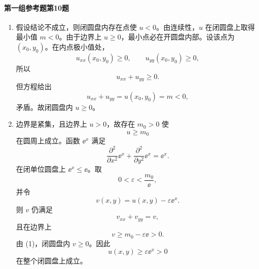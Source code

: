 \paragraph{第一组参考题第10题}
\begin{xsolution}
\begin{enumerate}[label=(\arabic*)]
  \item 假设结论不成立，则闭圆盘内存在点使 $u<0$。由连续性，$u$ 在闭圆盘上取得最小值 $m<0$。由于边界上 $u\ge0$，最小点必在开圆盘内部。设该点为 $(x_0,y_0)$。在内点极小值处，
  \[
    u_{xx}(x_0,y_0)\ge0,
    \qquad
    u_{yy}(x_0,y_0)\ge0,
  \]
  所以
  \[
    u_{xx}+u_{yy}\ge0.
  \]
  但方程给出
  \[
    u_{xx}+u_{yy}=u(x_0,y_0)=m<0,
  \]
  矛盾。故闭圆盘内 $u\ge0$。

  \item 边界是紧集，且边界上 $u>0$，故存在 $m_0>0$ 使
  \[
    u\ge m_0
  \]
  在圆周上成立。函数 $\ee^x$ 满足
  \[
    \frac{\partial^2}{\partial x^2}\ee^x
    +\frac{\partial^2}{\partial y^2}\ee^x
    =\ee^x.
  \]
  在闭单位圆盘上 $\ee^x\le\ee$。取
  \[
    0<\varepsilon<\frac{m_0}{\ee},
  \]
  并令
  \[
    v(x,y)=u(x,y)-\varepsilon\ee^x.
  \]
  则 $v$ 仍满足
  \[
    v_{xx}+v_{yy}=v,
  \]
  且在边界上
  \[
    v\ge m_0-\varepsilon\ee>0.
  \]
  由 (1)，闭圆盘内 $v\ge0$。因此
  \[
    u(x,y)\ge\varepsilon\ee^x>0
  \]
  在整个闭圆盘上成立。
\end{enumerate}
\end{xsolution}

